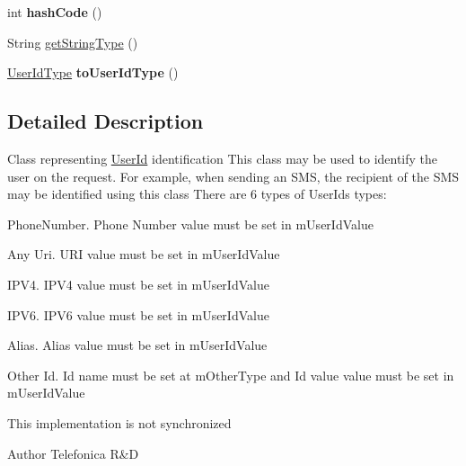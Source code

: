 \begin{DoxyCompactItemize}
\item 
\hypertarget{classcom_1_1bluevia_1_1commons_1_1data_1_1UserId_ab63aba816ebea823174a452671bc47d6}{
int {\bfseries hashCode} ()}
\label{classcom_1_1bluevia_1_1commons_1_1data_1_1UserId_ab63aba816ebea823174a452671bc47d6}

\item 
String \hyperlink{classcom_1_1bluevia_1_1commons_1_1data_1_1UserId_ab511177fa1287da43488e8e7e7fcfdb7}{getStringType} ()
\item 
\hypertarget{classcom_1_1bluevia_1_1commons_1_1data_1_1UserId_a7ae6ad6a7d5f08435f1e39e64ccae97f}{
\hyperlink{classcom_1_1telefonica_1_1schemas_1_1unica_1_1rest_1_1common_1_1v1_1_1UserIdType}{UserIdType} {\bfseries toUserIdType} ()}
\label{classcom_1_1bluevia_1_1commons_1_1data_1_1UserId_a7ae6ad6a7d5f08435f1e39e64ccae97f}

\end{DoxyCompactItemize}


\subsection{Detailed Description}
Class representing \hyperlink{classcom_1_1bluevia_1_1commons_1_1data_1_1UserId}{UserId} identification This class may be used to identify the user on the request. For example, when sending an SMS, the recipient of the SMS may be identified using this class There are 6 types of UserIds types: 
\begin{DoxyItemize}
\item PhoneNumber. Phone Number value must be set in mUserIdValue 
\item Any Uri. URI value must be set in mUserIdValue 
\item IPV4. IPV4 value must be set in mUserIdValue 
\item IPV6. IPV6 value must be set in mUserIdValue 
\item Alias. Alias value must be set in mUserIdValue 
\item Other Id. Id name must be set at mOtherType and Id value value must be set in mUserIdValue 
\end{DoxyItemize}

This implementation is not synchronized

\begin{DoxyAuthor}{Author}
Telefonica R\&D 
\end{DoxyAuthor}


